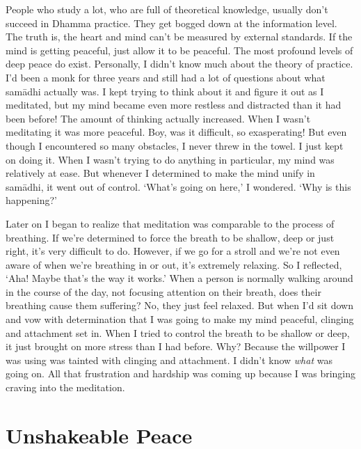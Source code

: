 People who study a lot, who are full of theoretical knowledge, usually don't succeed in Dhamma practice. They get bogged down at the information level. The truth is, the heart and mind can't be measured by external standards. If the mind is getting peaceful, just allow it to be peaceful. The most profound levels of deep peace do exist. Personally, I didn't know much about the theory of practice. I'd been a monk for three years and still had a lot of questions about what sam\=adhi actually was. I kept trying to think about it and figure it out as I meditated, but my mind became even more restless and distracted than it had been before! The amount of thinking actually increased. When I wasn't meditating it was more peaceful. Boy, was it difficult, so exasperating! But even though I encountered so many obstacles, I never threw in the towel. I just kept on doing it. When I wasn't trying to do anything in particular, my mind was relatively at ease. But whenever I determined to make the mind unify in sam\=adhi, it went out of control. `What's going on here,' I wondered. `Why is this happening?'

Later on I began to realize that meditation was comparable to the process of breathing. If we're determined to force the breath to be shallow, deep or just right, it's very difficult to do. However, if we go for a stroll and we're not even aware of when we're breathing in or out, it's extremely relaxing. So I reflected, `Aha! Maybe that's the way it works.' When a person is normally walking around in the course of the day, not focusing attention on their breath, does their breathing cause them suffering? No, they just feel relaxed. But when I'd sit down and vow with determination that I was going to make my mind peaceful, clinging and attachment set in. When I tried to control the breath to be shallow or deep, it just brought on more stress than I had before. Why? Because the willpower I was using was tainted with clinging and attachment. I didn't know \textit{what} was going on. All that frustration and hardship was coming up because I was bringing craving into the meditation.

\clearpage

\section*{Unshakeable Peace}

